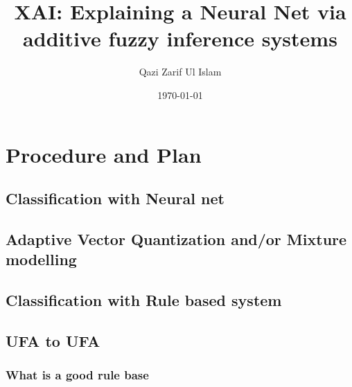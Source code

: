 \documentclass[12pt, letterpaper]{article}
\title{XAI: Explaining a Neural Net via additive fuzzy inference systems}
\author{Qazi Zarif Ul Islam}
\date{\today} %
\begin{document}
\maketitle

\section{Procedure and Plan}
\subsection{Classification with Neural net}

\subsection{Adaptive Vector Quantization and/or Mixture modelling}

\subsection{Classification with Rule based system}

\subsection{UFA to UFA}

\subsubsection{What is a good rule base}
\end{document}
